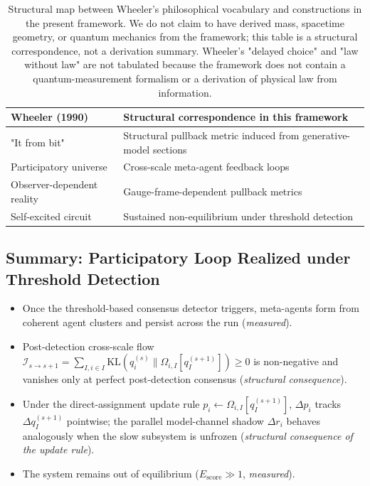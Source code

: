 \documentclass[11pt]{article}
\begin{document}
\begin{table}[h]
\centering
\begin{tabularx}{\textwidth}{|l|X|}
\hline
\textbf{Wheeler (1990)} & \textbf{Structural correspondence in this framework} \\
\hline
"It from bit" & Structural pullback metric induced from generative-model sections \\
Participatory universe & Cross-scale meta-agent feedback loops \\
Observer-dependent reality & Gauge-frame-dependent pullback metrics \\
Self-excited circuit & Sustained non-equilibrium under threshold detection \\
\hline
\end{tabularx}
\caption{Structural map between Wheeler's philosophical vocabulary and constructions in the present framework. We do not claim to have derived mass, spacetime geometry, or quantum mechanics from the framework; this table is a structural correspondence, not a derivation summary. Wheeler's "delayed choice" and "law without law" are not tabulated because the framework does not contain a quantum-measurement formalism or a derivation of physical law from information.}
\label{tab:wheeler_comparison}
\end{table}

\subsection{Summary: Participatory Loop Realized under Threshold Detection}

\begin{itemize}
\item Once the threshold-based consensus detector triggers, meta-agents form from coherent agent clusters and persist across the run (\emph{measured}).
\item Post-detection cross-scale flow $\mathcal{I}_{s \to s+1} = \sum_{I,i \in I}\mathrm{KL}(q_i^{(s)} \| \Omega_{i,I}[q_I^{(s+1)}]) \ge 0$ is non-negative and vanishes only at perfect post-detection consensus (\emph{structural consequence}).
\item Under the direct-assignment update rule $p_i \leftarrow \Omega_{i,I}[q_I^{(s+1)}]$, $\Delta p_i$ tracks $\Delta q_I^{(s+1)}$ pointwise; the parallel model-channel shadow $\Delta r_i$ behaves analogously when the slow subsystem is unfrozen (\emph{structural consequence of the update rule}).
\item The system remains out of equilibrium ($E_{\mathrm{score}} \gg 1$, \emph{measured}).
\end{itemize}
\end{document}
